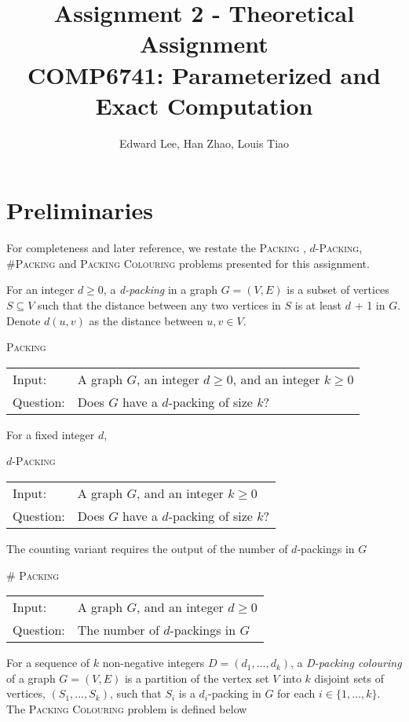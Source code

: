 \documentclass[10pt, a4paper]{article}
\title{Assignment 2 - Theoretical Assignment \\
 COMP6741: Parameterized and Exact Computation}
\author{Edward Lee, Han Zhao, Louis Tiao}
\theoremstyle{definition}
\newcommand{\n}{\\}
\begin{document}
\maketitle

\section*{Preliminaries}

For completeness and later reference, we restate the \textsc{Packing} , $d$-\textsc{Packing}, \#\textsc{Packing} and \textsc{Packing Colouring} problems presented for this assignment.

For an integer $d \geq 0$, a \emph{d-packing} in a graph $G = (V,E)$ is a subset of vertices $S \subseteq V$ such that the distance between any two vertices in $S$ is at least $d$ + 1 in $G$. Denote $d(u,v)$ as the distance between $u,v \in V$.

\begin{algorithm}[H]
\textsc{Packing\n}
\begin{tabular}{l l}
 Input:    & A graph $G$, an integer $d \geq 0$, and an integer $k \geq 0$ \n
 Question: & Does $G$ have a $d$-packing of size $k$? \n
\end{tabular}	
\end{algorithm}

For a fixed integer $d$, 

\begin{algorithm}[H]
\textsc{$d$-Packing\n}
\begin{tabular}{l l}
 Input:    & A graph $G$, and an integer $k \geq 0$ \n
 Question: & Does $G$ have a $d$-packing of size $k$? \n
\end{tabular}	
\end{algorithm}

The counting variant requires the output of the number of $d$-packings in $G$

\begin{algorithm}[H]
\textsc{\# Packing\n}
\begin{tabular}{l l}
 Input:    & A graph $G$, and an integer $d \geq 0$\n
 Question: & The number of $d$-packings in $G$ \n
\end{tabular}	
\end{algorithm}

For a sequence of $k$ non-negative integers $D = (d_1,...,d_k)$, a \emph{D-packing colouring} of a graph $G = (V,E)$ is a partition of the vertex set $V$ into $k$ disjoint sets of vertices, $(S_1,...,S_k)$, such that $S_i$ is a $d_i$-packing in $G$ for each $i \in \{1,...,k\}$. The \textsc{Packing Colouring} problem is defined below
\end{document}
